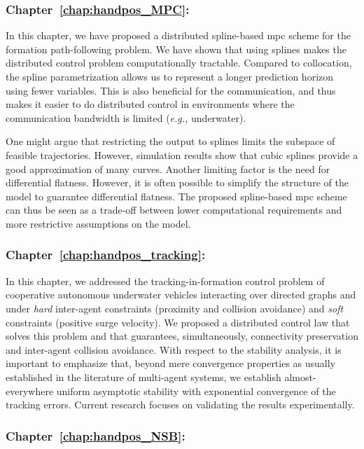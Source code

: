 \subsubsection{Chapter~\ref{chap:handpos_MPC}: }

In this chapter, we have proposed a distributed spline-based \gls{mpc} scheme for the formation path-following problem.
We have shown that using splines makes the distributed control problem computationally tractable.
Compared to collocation, the spline parametrization allows us to represent a longer prediction horizon using fewer variables.    
This is also beneficial for the communication, and thus makes it easier to do distributed control in environments where the communication bandwidth is limited (\emph{e.g.,} underwater).

One might argue that restricting the output to splines limits the subspace of feasible trajectories.
However, simulation results show that cubic splines provide a good approximation of many curves.
Another limiting factor is the need for differential flatness.
However, it is often possible to simplify the structure of the model to guarantee differential flatness.        
The proposed spline-based \gls{mpc} scheme can thus be seen as a trade-off between lower computational requirements and more restrictive assumptions on the model.

\subsubsection{Chapter~\ref{chap:handpos_tracking}: }

In this chapter, we addressed the tracking-in-formation control problem of cooperative autonomous underwater vehicles interacting over directed graphs and under \emph{hard} inter-agent constraints (proximity and collision avoidance) and \emph{soft} constraints (positive surge velocity). 
We proposed a distributed control law that solves this problem and that guarantees, simultaneously, connectivity preservation and inter-agent collision avoidance.
With respect to the stability analysis, it is important to emphasize that, beyond mere convergence properties as usually established in the literature of multi-agent systems, we establish almost-everywhere uniform asymptotic stability with exponential convergence of the tracking errors. 
Current research focuses on validating the results experimentally.

\subsubsection{Chapter~\ref{chap:handpos_NSB}: }

